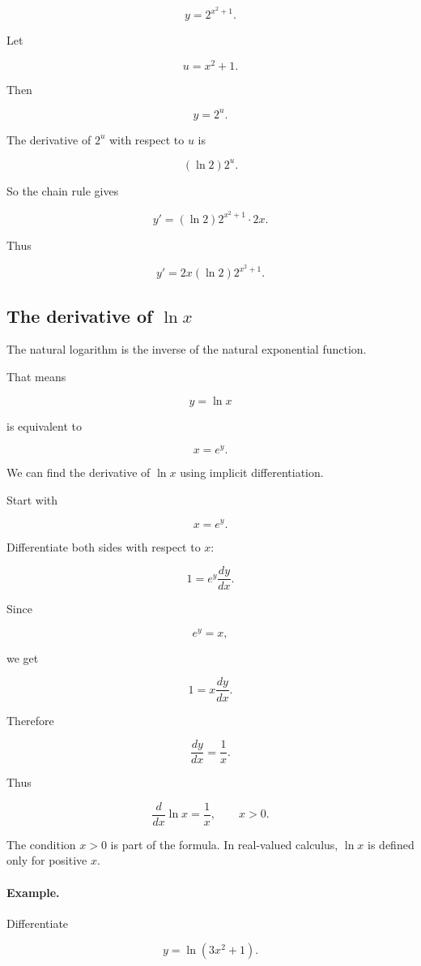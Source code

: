 \[
y=2^{x^2+1}.
\]

Let

\[
u=x^2+1.
\]

Then

\[
y=2^u.
\]

The derivative of \(2^u\) with respect to \(u\) is

\[
(\ln2)2^u.
\]

So the chain rule gives

\[
y'
=
(\ln2)2^{x^2+1}\cdot 2x.
\]

Thus

\[
\boxed{
y'=2x(\ln2)2^{x^2+1}.
}
\]

\subsection{The derivative of \texorpdfstring{\(\ln x\)}{ln x}}
\label{subsec:derivative-ln-x}

The natural logarithm is the inverse of the natural exponential function.

That means

\[
y=\ln x
\]

is equivalent to

\[
x=e^y.
\]

We can find the derivative of \(\ln x\) using implicit differentiation.

Start with

\[
x=e^y.
\]

Differentiate both sides with respect to \(x\):

\[
1=e^y\frac{dy}{dx}.
\]

Since

\[
e^y=x,
\]

we get

\[
1=x\frac{dy}{dx}.
\]

Therefore

\[
\frac{dy}{dx}=\frac1x.
\]

Thus

\[
\boxed{
\frac{d}{dx}\ln x=\frac1x,
\qquad x>0.
}
\]

The condition \(x>0\) is part of the formula.  In real-valued calculus, \(\ln x\) is defined only for positive \(x\).

\paragraph{Example.}
Differentiate

\[
y=\ln(3x^2+1).
\]

